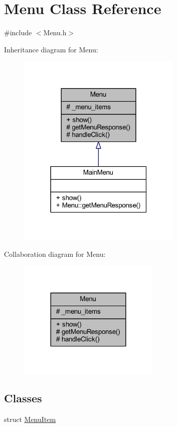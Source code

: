 \hypertarget{class_menu}{\section{Menu Class Reference}
\label{class_menu}
}


{\ttfamily \#include $<$Menu.\+h$>$}



Inheritance diagram for Menu\+:
\nopagebreak
\begin{figure}[H]
\begin{center}
\leavevmode
\includegraphics[width=223pt]{class_menu__inherit__graph}
\end{center}
\end{figure}


Collaboration diagram for Menu\+:
\nopagebreak
\begin{figure}[H]
\begin{center}
\leavevmode
\includegraphics[width=192pt]{class_menu__coll__graph}
\end{center}
\end{figure}
\subsection*{Classes}
\begin{DoxyCompactItemize}
\item 
struct \hyperlink{struct_menu_1_1_menu_item}{Menu\+Item}
\end{DoxyCompactItemize}
